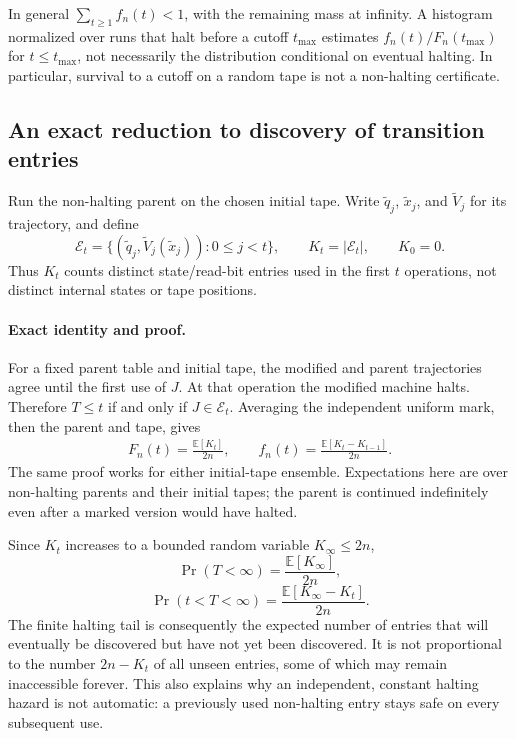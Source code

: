 \documentclass{article}
\begin{document}
In general $\sum_{t\geq1}f_n(t)<1$, with the remaining mass at infinity.
A histogram normalized over runs that halt before a cutoff $t_{\max}$
estimates $f_n(t)/F_n(t_{\max})$ for $t\leq t_{\max}$, not necessarily
the distribution conditional on eventual halting.  In particular,
survival to a cutoff on a random tape is not a non-halting certificate.

\subsection{An exact reduction to discovery of transition entries}

Run the non-halting parent on the chosen initial tape.  Write
$\widetilde q_j$, $\widetilde x_j$, and $\widetilde V_j$ for its trajectory,
and define
\begin{equation}
\mathcal E_t=
\bigl\{(\widetilde q_j,\widetilde V_j(\widetilde x_j)):
                  0\leq j<t\bigr\},\qquad
K_t=|\mathcal E_t|,\qquad K_0=0.
\end{equation}
Thus $K_t$ counts distinct state/read-bit entries used in the first $t$
operations, not distinct internal states or tape positions.

\paragraph{Exact identity and proof.}
For a fixed parent table and initial tape, the modified and parent
trajectories agree until the first use of $J$.  At that operation the
modified machine halts.  Therefore $T\leq t$ if and only if
$J\in\mathcal E_t$.  Averaging the independent uniform mark, then the
parent and tape, gives
\begin{align}
\boxed{F_n(t)=\frac{\mathbb E[K_t]}{2n},}\qquad
\boxed{f_n(t)=\frac{\mathbb E[K_t-K_{t-1}]}{2n}.}
\label{eq:halt-discovery}
\end{align}
The same proof works for either initial-tape ensemble.  Expectations here
are over non-halting parents and their initial tapes; the parent is
continued indefinitely even after a marked version would have halted.

Since $K_t$ increases to a bounded random variable $K_\infty\leq2n$,
\begin{equation}
\Pr(T<\infty)=\frac{\mathbb E[K_\infty]}{2n},
\label{eq:halt-total-mass}
\end{equation}
\begin{equation}
\boxed{\Pr(t<T<\infty)
 =\frac{\mathbb E[K_\infty-K_t]}{2n}.}
\label{eq:halt-finite-tail}
\end{equation}
The finite halting tail is consequently the expected number of entries
that will eventually be discovered but have not yet been discovered.
It is not proportional to the number $2n-K_t$ of all unseen entries,
some of which may remain inaccessible forever.  This also explains why
an independent, constant halting hazard is not automatic: a previously
used non-halting entry stays safe on every subsequent use.
\end{document}
